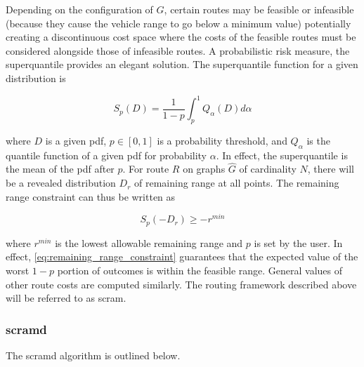 \documentclass[12pt]{article}
\begin{document}
Depending on the configuration of $G$, certain routes may be feasible or infeasible (because they cause the vehicle range to go below a minimum value) potentially creating a discontinuous cost space where the costs of the feasible routes must be considered alongside those of infeasible routes. A probabilistic risk measure, the superquantile provides an elegant solution. The superquantile function for a given distribution is

\begin{equation}
	S_p(D) = \frac{1}{1-p}\int_{p}^{1}Q_\alpha(D)d\alpha
\end{equation}

where $D$ is a given \gls{pdf}, $p\in[0, 1]$ is a probability threshold, and $Q_\alpha$ is the quantile function of a given \gls{pdf} for probability $\alpha$. In effect, the superquantile is the mean of the \gls{pdf} after $p$. For route $R$ on graphs $\hat{G}$ of cardinality $N$, there will be a revealed distribution $D_r$ of remaining range at all points. The remaining range constraint can thus be written as

\begin{equation}
	S_p(-D_r)\geq -r^{min} \label{eq:remaining_range_constraint}
\end{equation}

where $r^{min}$ is the lowest allowable remaining range and $p$ is set by the user. In effect, \eqref{eq:remaining_range_constraint} guarantees that the expected value of the worst $1-p$ portion of outcomes is within the feasible range. General values of other route costs are computed similarly. The routing framework described above will be referred to as \gls{scram}.

\subsubsection*{\gls{scramd}}

The \gls{scramd} algorithm is outlined below.
\end{document}
